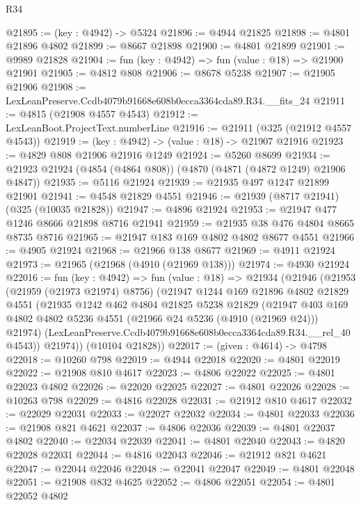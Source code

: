 \begin{lexlean}{R34}
\begin{coremodule}
@21895 := (key : @4942) -> @5324
@21896 := @4944 @21825
@21898 := @4801 @21896 @4802
@21899 := @8667 @21898
@21900 := @4801 @21899
@21901 := @9989 @21828
@21904 := fun (key : @4942) => fun (value : @18) => @21900 @21901
@21905 := @4812 @808
@21906 := @8678 @5238
@21907 := @21905 @21906
@21908 := LexLeanPreserve.Ccdb4079b91668e608b0ecca3364cda89.R34.__fits_24
@21911 := @4815 (@21908 @4557 @4543)
@21912 := LexLeanBoot.ProjectText.numberLine
@21916 := @21911 (@325 (@21912 @4557 @4543))
@21919 := (key : @4942) -> (value : @18) -> @21907 @21916
@21923 := @4829 @808 @21906 @21916 @1249
@21924 := @5260 @8699
@21934 := @21923 @21924 (@4854 (@4864 @808)) (@4870 (@4871 (@4872 @1249) @21906 @4847))
@21935 := @5116 @21924
@21939 := @21935 @497 @1247 @21899 @21901
@21941 := @4548 @21829 @4551
@21946 := @21939 (@8717 @21941) (@325 (@10035 @21828))
@21947 := @4896 @21924
@21953 := @21947 @477 @1246 @8666 @21898 @8716 @21941
@21959 := @21935 @38 @476 @4804 @8665 @8735 @8716
@21965 := @21947 @183 @169 @4802 @4802 @8677 @4551
@21966 := @4905 @21924
@21968 := @21966 @138 @8677
@21969 := @4911 @21924
@21973 := @21965 (@21968 (@4910 (@21969 @138)))
@21974 := @4930 @21924
@22016 := fun (key : @4942) =>
  fun (value : @18) =>
  @21934
    (@21946
      (@21953
        (@21959 (@21973 @21974) @8756)
        (@21947
          @1244
          @169
          @21896
          @4802
          @21829
          @4551
          (@21935
            @1242
            @462
            @4804
            @21825
            @5238
            @21829
            (@21947
              @403
              @169
              @4802
              @4802
              @5236
              @4551
              (@21966 @24 @5236 (@4910 (@21969 @24)))
              @21974)
            (LexLeanPreserve.Ccdb4079b91668e608b0ecca3364cda89.R34.__rel_40 @4543))
          @21974))
      (@10104 @21828))
@22017 := (given : @4614) -> @4798
@22018 := @10260 @798
@22019 := @4944 @22018
@22020 := @4801 @22019
@22022 := @21908 @810 @4617
@22023 := @4806 @22022
@22025 := @4801 @22023 @4802
@22026 := @22020 @22025
@22027 := @4801 @22026
@22028 := @10263 @798
@22029 := @4816 @22028
@22031 := @21912 @810 @4617
@22032 := @22029 @22031
@22033 := @22027 @22032
@22034 := @4801 @22033
@22036 := @21908 @821 @4621
@22037 := @4806 @22036
@22039 := @4801 @22037 @4802
@22040 := @22034 @22039
@22041 := @4801 @22040
@22043 := @4820 @22028 @22031
@22044 := @4816 @22043
@22046 := @21912 @821 @4621
@22047 := @22044 @22046
@22048 := @22041 @22047
@22049 := @4801 @22048
@22051 := @21908 @832 @4625
@22052 := @4806 @22051
@22054 := @4801 @22052 @4802

\end{coremodule}
\end{lexlean}
